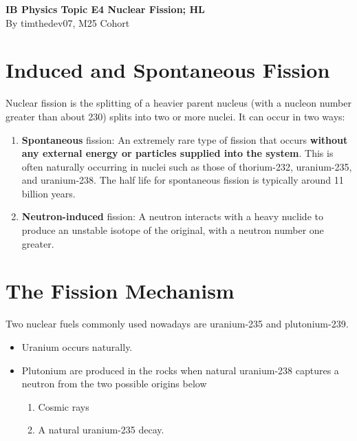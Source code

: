 \documentclass[a4paper,12pt]{article}
\let\oldsection\section
\renewcommand\section{\clearpage\oldsection}
\begin{document}
\pagestyle{fancy}


\begin{titlepage}
  \begin{center}

    \vspace*{8cm}
    \textbf{\Large {IB Physics Topic E4 Nuclear Fission; HL}} \\
    \vspace*{1cm}
    \large{By timthedev07, M25 Cohort}

  \end{center}
\end{titlepage}

\pagebreak
\tableofcontents
\pagebreak

\clearpage
\setcounter{page}{1}

\section{Induced and Spontaneous Fission}

Nuclear fission is the splitting of a heavier parent nucleus (with a nucleon number greater than about 230) splits into two or more nuclei. It can occur in two ways:
\begin{enumerate}
  \item \textbf{Spontaneous} fission: An extremely rare type of fission that occurs \textbf{without any external energy or particles supplied into the system}. This is often naturally occurring in nuclei such as those of thorium-232, uranium-235, and uranium-238. The half life for spontaneous fission is typically around 11 billion years.
  \item \textbf{Neutron-induced} fission: A neutron interacts with a heavy nuclide to produce an unstable isotope of the original, with a neutron number one greater.
\end{enumerate}

\section{The Fission Mechanism}

Two nuclear fuels commonly used nowadays are uranium-235 and plutonium-239.
\begin{itemize}
  \item Uranium occurs naturally.
  \item Plutonium are produced in the rocks when natural uranium-238 captures a neutron from the two possible origins below
        \begin{enumerate}
          \item Cosmic rays
          \item A natural uranium-235 decay.
        \end{enumerate}
\end{itemize}
\end{document}
